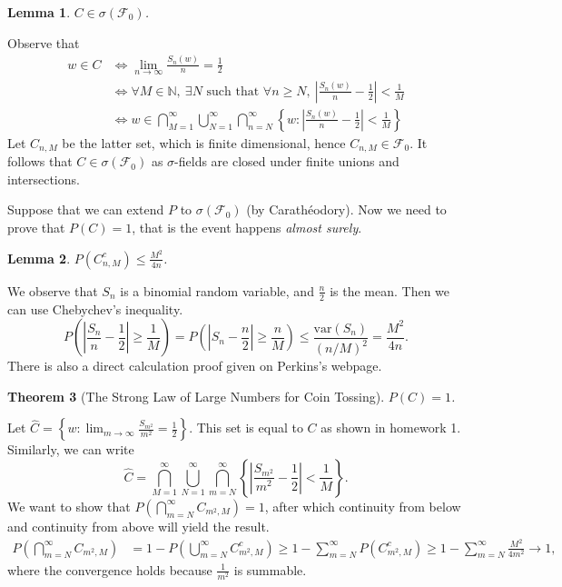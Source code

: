 \documentclass[11pt]{article}
\newtheorem{thm}{Theorem}[section]
\newtheorem{lemma}[thm]{Lemma}
\theoremstyle{definition}
\newcommand{\set}[1]{\left\{ #1 \right\}}
\newcommand{\abs}[1]{\left\lvert#1\right\rvert} %
\newcommand{\NN}{\mathbb{N}}
\newcommand{\m}[1]{\mathcal{#1}}
\begin{document}

\begin{lemma}
    $C\in\sigma(\m{F}_0)$.
\end{lemma}
\proof
Observe that
\begin{align*}
	w \in C &\iff \lim_{n\to\infty} \frac{S_n(w)}{n} = \frac12 \\
	&\iff \forall M \in \NN,~ \exists N \text{ such that } \forall n\ge N,~
	\abs{\frac{S_n(w)}{n}-\frac12} < \frac1M \\
	&\iff w \in \bigcap_{M=1}^\infty \bigcup_{N=1}^\infty \bigcap_{n=N}^\infty
	\set{w:\abs{\frac{S_n(w)}{n}-\frac12}<\frac1M}
\end{align*}
Let $C_{n,M}$ be the latter set, which is finite dimensional, hence $C_{n,M}\in\m{F}_0$.
It follows that $C\in\sigma(\m{F}_0)$ as $\sigma$-fields are closed under finite unions
and intersections. 
\qedhere

Suppose that we can extend $P$ to $\sigma(\m{F}_0)$ (by Carath\'eodory). Now we need to prove
that $P(C)=1$, that is the event happens \emph{almost surely}.

\begin{lemma}
$P(C_{n,M}^c) \le \frac{M^2}{4n}$.
\end{lemma}
\proof
We observe that $S_n$ is a binomial random variable, and $\frac{n}{2}$ is the mean. Then
we can use Chebychev's inequality.
\[
	P\left(\abs{\frac{S_n}{n}-\frac12}\ge\frac1M\right) 
	= P\left(\abs{S_n-\frac{n}{2}}\ge\frac{n}{M}\right)
	\le \frac{\text{var}(S_n)}{(n/M)^2} = \frac{M^2}{4n} .
\]
There is also a direct calculation proof given on Perkins's webpage.
\qedhere

\begin{thm}[The Strong Law of Large Numbers for Coin Tossing]
	$P(C)=1$. 
\end{thm}
\proof
Let $\hat{C} = \set{w:\lim_{m\to\infty}\frac{S_{m^2}}{m^2}=\frac12}$. This set is equal to
$C$ as shown in homework 1. Similarly, we can write 
\[
	\hat{C} = \bigcap_{M=1}^\infty \bigcup_{N=1}^\infty \bigcap_{m=N}^\infty
	\set{\abs{\frac{S_{m^2}}{m^2}-\frac12}<\frac1M} .
\]
We want to show that $P\left(\bigcap_{m=N}^\infty C_{m^2,M}\right) = 1$, after which
continuity from below and continuity from above will yield the result. 
\begin{align*}
	P\left(\bigcap_{m=N}^\infty C_{m^2,M}\right) 
	&= 1 - P\left(\bigcup_{m=N}^\infty C_{m^2,M}^c\right)
	\ge 1 - \sum_{m=N}^\infty P(C_{m^2,M}^c)
	\ge 1 - \sum_{m=N}^\infty \frac{M^2}{4m^2} \to 1 ,
\end{align*}
where the convergence holds because $\frac1{m^2}$ is summable.
\end{document}
